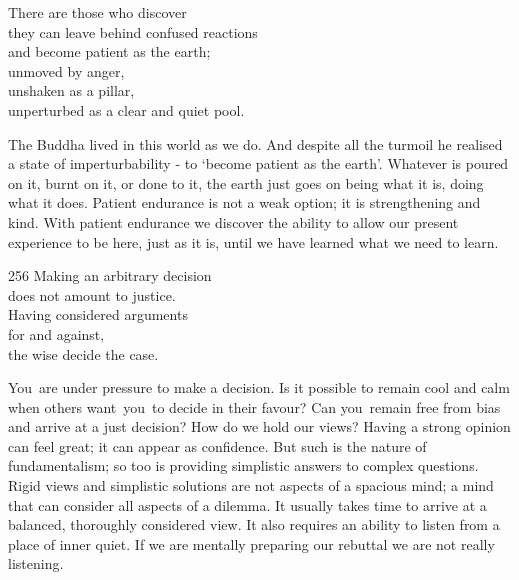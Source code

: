 
\begin{dhpVerse}{95}
\label{dhp-95}
There are those who discover\\
they can leave behind confused reactions\\
and become patient as the earth;\\
unmoved by anger,\\
unshaken as a pillar,\\
unperturbed as a clear and quiet pool.
\end{dhpVerse}

\begin{dhpRefl}

The Buddha lived in this world as we do. And despite all the turmoil
he realised a state of imperturbability - to `become patient as the
earth'. Whatever is poured on it, burnt on it, or done to it, the
earth just goes on being what it is, doing what it does. Patient
endurance is not a weak option; it is strengthening and kind. With
patient endurance we discover the ability to allow our present
experience to be here, just as it is, until we have learned what we
need to learn.

\end{dhpRefl}


\begin{dhpVerse}{256}
\label{dhp-256}
Making an arbitrary decision\\
does not amount to justice.\\
Having considered arguments\\
for and against,\\
the wise decide the case.
\end{dhpVerse}

\begin{dhpRefl}

You are under pressure to make a decision. Is it possible to remain
cool and calm when others want you to decide in their favour? Can
you remain free from bias and arrive at a just decision? How do we
hold our views? Having a strong opinion can feel great; it can appear
as confidence. But such is the nature of fundamentalism; so too is
providing simplistic answers to complex questions. Rigid views and
simplistic solutions are not aspects of a spacious mind; a mind that
can consider all aspects of a dilemma. It usually takes time to
arrive at a balanced, thoroughly considered view. It also requires an
ability to listen from a place of inner quiet. If we are mentally
preparing our rebuttal we are not really listening.

\end{dhpRefl}

